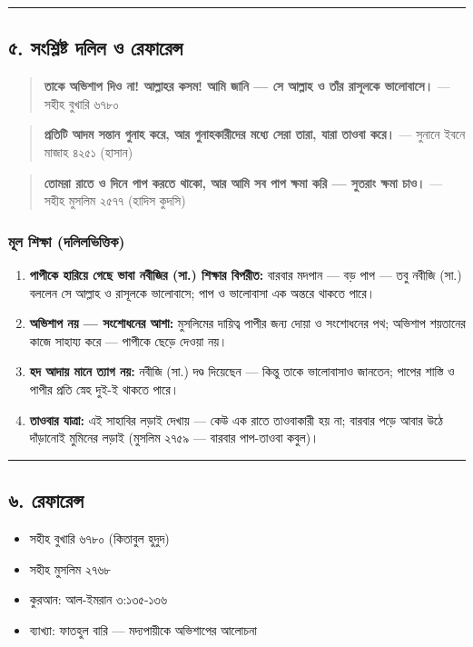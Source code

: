 \medskip\hrule\medskip

\subsection*{৫. সংশ্লিষ্ট দলিল ও রেফারেন্স}

\begin{quote}
\textbf{তাকে অভিশাপ দিও না! আল্লাহর কসম! আমি জানি — সে আল্লাহ ও তাঁর রাসূলকে ভালোবাসে।} — সহীহ বুখারি ৬৭৮০
\end{quote}

\begin{quote}
\textbf{প্রতিটি আদম সন্তান গুনাহ করে, আর গুনাহকারীদের মধ্যে সেরা তারা, যারা তাওবা করে।} — সুনানে ইবনে মাজাহ ৪২৫১ (হাসান)
\end{quote}

\begin{quote}
\textbf{তোমরা রাতে ও দিনে পাপ করতে থাকো, আর আমি সব পাপ ক্ষমা করি — সুতরাং ক্ষমা চাও।} — সহীহ মুসলিম ২৫৭৭ (হাদিস কুদসি)
\end{quote}

\subsubsection*{মূল শিক্ষা (দলিলভিত্তিক)}

\begin{enumerate}
\item \textbf{পাপীকে হারিয়ে গেছে ভাবা নবীজির (সা.) শিক্ষার বিপরীত:} বারবার মদপান — বড় পাপ — তবু নবীজি (সা.) বললেন সে আল্লাহ ও রাসূলকে ভালোবাসে; পাপ ও ভালোবাসা এক অন্তরে থাকতে পারে।
\item \textbf{অভিশাপ নয় — সংশোধনের আশা:} মুসলিমের দায়িত্ব পাপীর জন্য দোয়া ও সংশোধনের পথ; অভিশাপ শয়তানের কাজে সাহায্য করে — পাপীকে ছেড়ে দেওয়া নয়।
\item \textbf{হদ আদায় মানে ত্যাগ নয়:} নবীজি (সা.) দণ্ড দিয়েছেন — কিন্তু তাকে ভালোবাসাও জানতেন; পাপের শাস্তি ও পাপীর প্রতি স্নেহ দুই-ই থাকতে পারে।
\item \textbf{তাওবার যাত্রা:} এই সাহাবির লড়াই দেখায় — কেউ এক রাতে তাওবাকারী হয় না; বারবার পড়ে আবার উঠে দাঁড়ানোই মুমিনের লড়াই (মুসলিম ২৭৫৯ — বারবার পাপ-তাওবা কবুল)।
\end{enumerate}
\medskip\hrule\medskip

\subsection*{৬. রেফারেন্স}

\begin{itemize}
\item সহীহ বুখারি ৬৭৮০ (কিতাবুল হুদুদ)
\item সহীহ মুসলিম ২৭৬৮
\item কুরআন: আল-ইমরান ৩:১৩৫-১৩৬
\item ব্যাখ্যা: ফাতহুল বারি — মদ্যপায়ীকে অভিশাপের আলোচনা
\end{itemize}


